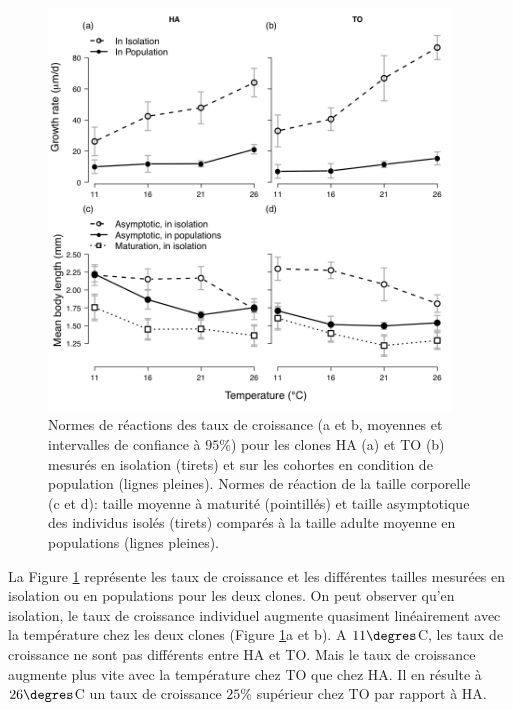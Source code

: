 \begin{figure}[!ht]
\begin{center}
\includegraphics[width=0.95\textwidth]{1_CorpsDeThese/Resumes/Fig/FIP03}
\caption[Normes de réactions des taux
de croissance et tailles moyennes]{Normes de réactions des taux de croissance (a
et b, moyennes et intervalles de confiance à $95\%$) pour les clones HA (a) et TO (b) mesurés en isolation (tirets) et sur les cohortes en condition de population (lignes pleines). Normes
de réaction de la taille corporelle (c et d): taille moyenne à maturité
(pointillés) et taille asymptotique des individus isolés (tirets) comparés à la
taille adulte moyenne en populations (lignes pleines).}
\label{fig:FIP3}
\end{center}
\end{figure}

La Figure \ref{fig:FIP3} représente les taux de croissance et les différentes
tailles mesurées en isolation ou en populations pour les deux clones. On peut
observer qu'en isolation, le taux de croissance individuel augmente quasiment
linéairement avec la température chez les deux clones (Figure \ref{fig:FIP3}a
et b). A $11\degres$C, les taux de croissance ne sont pas différents entre HA et
TO. Mais le taux de croissance augmente plus vite avec
la température chez TO que chez HA. Il en résulte à
$26\degres$C un taux de croissance $25\%$ supérieur chez TO par rapport à HA. 


